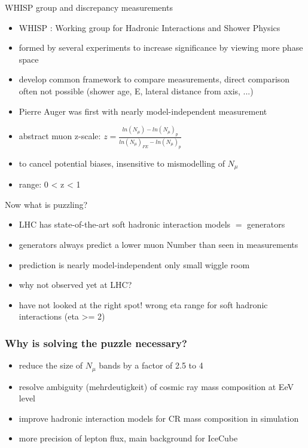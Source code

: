 \documentclass[aspectratio=1610, 9pt]{beamer}
\begin{document}
\begin{frame}{WHISP group and discrepancy measurements}
  \begin{itemize}
    \item WHISP : Working group for Hadronic Interactions and Shower Physics
    \item formed by several experiments to increase significance by viewing more phase space
    \item develop common framework to compare measurements, direct comparison often not possible (shower age, E, lateral distance from axis, ...)
    \item Pierre Auger was first with nearly model-independent measurement
    \item abstract muon z-scale: $z = \frac{ln(N_\mu) - ln(N_\mu)_p}{ln(N_\mu)_{FE} - ln(N_\mu)_p}$
    \item to cancel potential biases, insensitive to mismodelling of $N_{\mu}$
    \item range: 0 < z < 1
  \end{itemize}
\end{frame}

\begin{frame}{Now what is puzzling?}
  \begin{itemize}
    \item LHC has state-of-the-art soft hadronic interaction models $=$ generators
    \item generators always predict a lower muon Number than seen in measurements
    \item prediction is nearly model-independent \to only small wiggle room
    \item why not observed yet at LHC?
    \item have not looked at the right spot! wrong eta range for soft hadronic interactions (eta >= 2)
  \end{itemize}
\end{frame}


\begin{frame}\frametitle{Why is solving the puzzle necessary?}
  \begin{itemize}
    \item reduce the size of $N_\mu$ bands by a factor of 2.5 to 4
    \item resolve ambiguity (mehrdeutigkeit) of cosmic ray mass composition at EeV level
    \item improve hadronic interaction models for CR mass composition in simulation
    \item more precision of lepton flux, main background for IceCube
  \end{itemize}
\end{frame}
\end{document}

